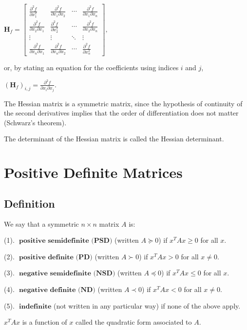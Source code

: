 \documentclass[11pt]{elegantbook}
\begin{document}
$
\mathbf{H}_{f}=\left[\begin{array}{cccc}
\frac{\partial^{2} f}{\partial x_{1}^{2}} & \frac{\partial^{2} f}{\partial x_{1} \partial x_{2}} & \cdots & \frac{\partial^{2} f}{\partial x_{1} \partial x_{n}} \\
\frac{\partial^{2} f}{\partial x_{2} \partial x_{1}} & \frac{\partial^{2} f}{\partial x_{2}^{2}} & \cdots & \frac{\partial^{2} f}{\partial x_{2} \partial x_{n}} \\
\vdots & \vdots & \ddots & \vdots \\
\frac{\partial^{2} f}{\partial x_{n} \partial x_{1}} & \frac{\partial^{2} f}{\partial x_{n} \partial x_{2}} & \cdots & \frac{\partial^{2} f}{\partial x_{n}^{2}}
\end{array}\right],
$

or, by stating an equation for the coefficients using indices $i$ and $j$,

$
\left(\mathbf{H}_{f}\right)_{i, j}=\frac{\partial^{2} f}{\partial x_{i} \partial x_{j}} .
$

The Hessian matrix is a symmetric matrix, since the hypothesis of continuity of the second derivatives implies that the order of differentiation does not matter (Schwarz's theorem).

The determinant of the Hessian matrix is called the Hessian determinant.

\section{Positive Definite Matrices}
\subsection{Definition}
We say that a symmetric $n \times n$ matrix $A$ is:

(1). $\textbf{ positive semidefinite (PSD)}$ (written $A \succeq 0$) if $x^TAx \geq 0$ for all $x$.

(2). $\textbf{ positive definite (PD)}$ (written $A \succ 0$) if $x^TAx > 0$ for all $x\neq 0$.

(3). $\textbf{ negative semidefinite (NSD)}$ (written $A \preceq 0$) if $x^TAx \leq 0$ for all $x$.

(4). $\textbf{ negative definite (ND)}$ (written $A \prec 0$) if $x^TAx < 0$ for all $x\neq 0$.

(5). $\textbf{ indefinite}$ (not written in any particular way) if none of the above apply.

$x^TAx$ is a function of $x$ called the quadratic form associated to $A$.
\end{document}
